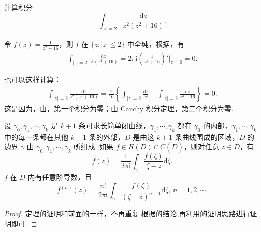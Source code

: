 \documentclass[../../main.tex]{subfiles}%
\begin{document}
\begin{example}
计算积分
\[
\int_{|z| = 2} \frac{\mathrm{d}z}{z^2(z^2 + 16)}.
\]
\end{example}
\begin{solution}

令 \( f(z) = \frac{1}{z^2 + 16} \)，则 \( f \) 在 \( \{z: |z| \leqslant 2\} \) 中全纯，根据，有
\begin{align*}
\int_{|z| = 2} \frac{\mathrm{d}z}{z^2(z^2 + 16)} = 2\pi \mathrm{i} \left( \frac{1}{z^2 + 16} \right)' \bigg|_{z = 0} = 0.
\end{align*}

也可以这样计算：
\begin{align*}
\int_{|z| = 2} \frac{\mathrm{d}z}{z^2(z^2 + 16)} = \frac{1}{16} \left\{ \int_{|z| = 2} \frac{\mathrm{d}z}{z^2} - \int_{|z| = 2} \frac{\mathrm{d}z}{z^2 + 16} \right\} = 0.
\end{align*}
这是因为，由，第一个积分为零；由 \hyperref[theorem:Cauchy-Goursat定理(Cauchy积分定理)]{Cauchy 积分定理}，第二个积分为零. 

\end{solution}

\begin{theorem}\label{theorem:定理3.4.6}
设 \( \gamma_0, \gamma_1, \cdots, \gamma_k \) 是 \( k + 1 \) 条可求长简单闭曲线，\( \gamma_1, \cdots, \gamma_k \) 都在 \( \gamma_0 \) 的内部，\( \gamma_1, \cdots, \gamma_k \) 中的每一条都在其他 \( k - 1 \) 条的外部，\( D \) 是由这 \( k + 1 \) 条曲线围成的区域，\( D \) 的边界 \( \gamma \) 由 \( \gamma_0, \gamma_1, \cdots, \gamma_k \) 所组成. 如果 \( f \in H(D) \cap C(\overline{D}) \)，则对任意 \( z \in D \)，有
\[
f(z) = \frac{1}{2\pi \mathrm{i}} \int_{\gamma} \frac{f(\zeta)}{\zeta - z} \mathrm{d}\zeta.
\]
\( f \) 在 \( D \) 内有任意阶导数，且
\[
f^{(n)}(z) = \frac{n!}{2\pi \mathrm{i}} \int_{\gamma} \frac{f(\zeta)}{(\zeta - z)^{n + 1}} \mathrm{d}\zeta, \, n = 1, 2, \cdots.
\]
\end{theorem}
\begin{proof}

定理的证明和前面的一样，不再重复.根据的结论,再利用的证明思路进行证明即可.

\end{proof}
\end{document}
